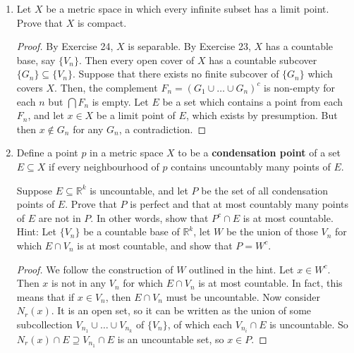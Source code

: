 \documentclass{scrbook}
\newcommand{\N}{\mathbb{N}}
\newcommand{\R}{\mathbb{R}}
\begin{document}
\begin{enumerate}
\begin{proof}
For $n \in \N$, consider the cover $\{N_{1/n}(x): x \in K\}$. Since $K$ is compact, some finite subset of these neighbourhoods must cover $K$. From the same conclusion as in Exercise 24, the set $G$ of all the centres of the neighbourhoods for $n \in \N$ forms a countable dense set in $K$, so $K$ is separable.
\end{proof}

\item %
Let $X$ be a metric space in which every infinite subset has a limit point. Prove that $X$ is compact. 

\begin{proof}
By Exercise 24, $X$ is separable. By Exercise 23, $X$ has a countable base, say $\{V_n\}$. Then every open cover of $X$ has a countable subcover $\{G_n\} \subseteq \{V_n\}$. Suppose that there exists no finite subcover of $\{G_n\}$ which covers $X$. Then, the complement $F_n = \left( G_1 \cup \dotsc \cup G_n\right)^c$ is non-empty for each $n$ but $\bigcap F_n$ is empty. Let $E$ be a set which contains a point from each $F_n$, and let $x \in X$ be a limit point of $E$, which exists by presumption. But then $x \not\in G_n$ for any $G_n$, a contradiction.
\end{proof}

\item %
Define a point $p$ in a metric space $X$ to be a \textbf{condensation point} of a set $E \subseteq X$ if every neighbourhood of $p$ contains uncountably many points of $E$.

Suppose $E \subseteq \R^k$ is uncountable, and let $P$ be the set of all condensation points of $E$. Prove that $P$ is perfect and that at most countably many points of $E$ are not in $P$. In other words, show that $P^c \cap E$ is at most countable. Hint: Let $\{V_n\}$ be a countable base of $\R^k$, let $W$ be the union of those $V_n$ for which $E \cap V_n$ is at most countable, and show that $P = W^c$.

\begin{proof}
We follow the construction of $W$ outlined in the hint. Let $x \in W^c$. Then $x$ is not in any $V_n$ for which $E \cap V_n$ is at most countable. In fact, this means that if $x \in V_n$, then $E \cap V_n$ must be uncountable. Now consider $N_r(x)$. It is an open set, so it can be written as the union of some subcollection $V_{n_1} \cup \dotsc \cup V_{n_k}$ of $\{V_n\}$, of which each $V_{n_i} \cap E$ is uncountable. So $N_r(x) \cap E \supseteq V_{n_1} \cap E$ is an uncountable set, so $x \in P$.


\end{proof}
\end{enumerate}
\end{document}
